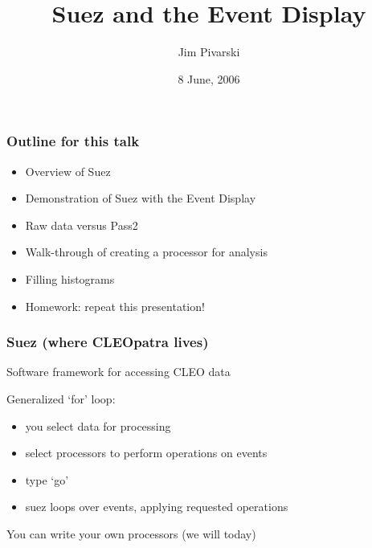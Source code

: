 \documentclass[12pt,compress]{beamer}
\title{Suez and the Event Display}
\author{Jim Pivarski}
\institute{Cornell University}
\date{8 June, 2006}
\begin{document}
\addtocounter{page}{-1}
\frame{\titlepage}

\begin{frame}
\frametitle{Outline for this talk}
\begin{itemize}\setlength{\itemsep}{0.5 cm}
\item Overview of Suez
\item Demonstration of Suez with the Event Display
\item Raw data versus Pass2
\item Walk-through of creating a processor for analysis
\item Filling histograms
\item Homework: repeat this presentation!
\end{itemize}
\end{frame}

\begin{frame}
\frametitle{Suez (where CLEOpatra lives)}
Software framework for accessing CLEO data

\vfill
Generalized `for' loop:
\begin{itemize}
\item you select data for processing
\item select processors to perform operations on events
\item type `go'
\item suez loops over events, applying requested operations
\end{itemize}

\vfill
You can write your own processors (we will today)
\end{frame}
\end{document}
